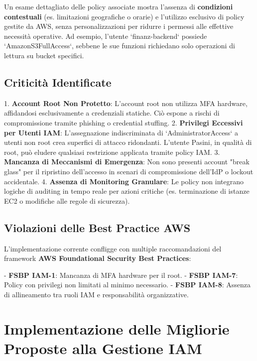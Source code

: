 \documentclass[a4paper,12pt]{report}
\begin{document}
Un esame dettagliato delle policy associate mostra l'assenza di \textbf{condizioni contestuali} (es. limitazioni geografiche o orarie) e l'utilizzo esclusivo di policy gestite da AWS, senza personalizzazioni per ridurre i permessi alle effettive necessità operative\cite{ref6}. Ad esempio, l'utente `finanz-backend` possiede `AmazonS3FullAccess`, sebbene le sue funzioni richiedano solo operazioni di lettura su bucket specifici.

\subsection{Criticità Identificate}

1. \textbf{Account Root Non Protetto}: L'account root non utilizza MFA hardware, affidandosi esclusivamente a credenziali statiche\cite{ref3}. Ciò espone a rischi di compromissione tramite phishing o credential stuffing.
2. \textbf{Privilegi Eccessivi per Utenti IAM}: L'assegnazione indiscriminata di `AdministratorAccess` a utenti non root crea superfici di attacco ridondanti. L'utente Pasini, in qualità di root, può eludere qualsiasi restrizione applicata tramite policy IAM\cite{ref2}.
3. \textbf{Mancanza di Meccanismi di Emergenza}: Non sono presenti account "break glass" per il ripristino dell'accesso in scenari di compromissione dell'IdP o lockout accidentale\cite{ref4}.
4. \textbf{Assenza di Monitoring Granulare}: Le policy non integrano logiche di auditing in tempo reale per azioni critiche (es. terminazione di istanze EC2 o modifiche alle regole di sicurezza)\cite{ref7}.

\subsection{Violazioni delle Best Practice AWS}

L'implementazione corrente confligge con multiple raccomandazioni del framework \textbf{AWS Foundational Security Best Practices}:

- \textbf{FSBP IAM-1}: Mancanza di MFA hardware per il root\cite{ref3}.
- \textbf{FSBP IAM-7}: Policy con privilegi non limitati al minimo necessario\cite{ref5}.
- \textbf{FSBP IAM-8}: Assenza di allineamento tra ruoli IAM e responsabilità organizzative\cite{ref2}.
\section{Implementazione delle Migliorie Proposte alla Gestione IAM}
\label{sec:implementazione_migliorie}
\end{document}
